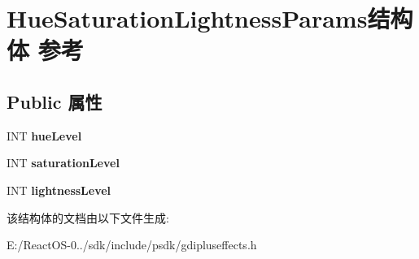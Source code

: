 \hypertarget{struct_hue_saturation_lightness_params}{}\section{Hue\+Saturation\+Lightness\+Params结构体 参考}
\label{struct_hue_saturation_lightness_params}
\subsection*{Public 属性}
\begin{DoxyCompactItemize}
\item 
\mbox{\label{struct_hue_saturation_lightness_params_a845d261f736ac2b012a4ffa4809421cb}} 
I\+NT {\bfseries hue\+Level}
\item 
\mbox{\label{struct_hue_saturation_lightness_params_a376260f62adcc1c8aa59d55f6390c391}} 
I\+NT {\bfseries saturation\+Level}
\item 
\mbox{\label{struct_hue_saturation_lightness_params_ab8454770f9c4315b58063ebd250cf4f2}} 
I\+NT {\bfseries lightness\+Level}
\end{DoxyCompactItemize}


该结构体的文档由以下文件生成\+:\begin{DoxyCompactItemize}
\item 
E\+:/\+React\+O\+S-\/0../sdk/include/psdk/gdipluseffects.\+h\end{DoxyCompactItemize}
